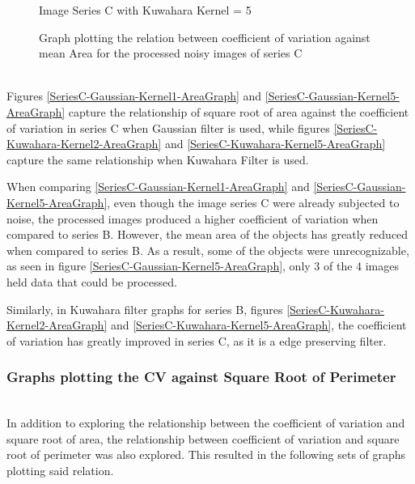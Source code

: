 \documentclass[runningheads]{llncs}
\begin{document}
\begin{figure}[h!]
\begin{minipage}[h]{0.47\linewidth}
\begin{center}
\caption{Image Series C with Kuwahara Kernel = 5}
\label{SeriesC-Kuwahara-Kernel5-AreaGraph}
\end{center}
\end{minipage}
\caption*{Graph plotting the relation between coefficient of variation against mean Area for the processed noisy images of series C}
\label{SeriesC-Gaussian/Kuwahara-AreaGraph}
\end{figure}
\\ Figures \ref{SeriesC-Gaussian-Kernel1-AreaGraph} and \ref{SeriesC-Gaussian-Kernel5-AreaGraph} capture the relationship of square root of area against the coefficient of variation in series C when Gaussian filter is used, while figures \ref{SeriesC-Kuwahara-Kernel2-AreaGraph} and \ref{SeriesC-Kuwahara-Kernel5-AreaGraph} capture the same relationship when Kuwahara Filter is used. 
\par When comparing \ref{SeriesC-Gaussian-Kernel1-AreaGraph} and \ref{SeriesC-Gaussian-Kernel5-AreaGraph}, even though the image series C were already subjected to noise, the processed images produced a higher coefficient of variation when compared to series B. However, the mean area of the objects has greatly reduced when compared to series B. As a result, some of the objects were unrecognizable, as seen in figure \ref{SeriesC-Gaussian-Kernel5-AreaGraph}, only 3 of the 4 images held data that could be processed. 
\par Similarly, in Kuwahara filter graphs for series B, figures \ref{SeriesC-Kuwahara-Kernel2-AreaGraph} and \ref{SeriesC-Kuwahara-Kernel5-AreaGraph}, the coefficient of variation has greatly improved in series C, as it is a edge preserving filter. 
\subsubsection*{Graphs plotting the CV against Square Root of Perimeter}
~\\ In addition to exploring the relationship between the coefficient of variation and square root of area, the relationship between coefficient of variation and square root of perimeter was also explored. This resulted in the following sets of graphs plotting said relation. 
\end{document}
